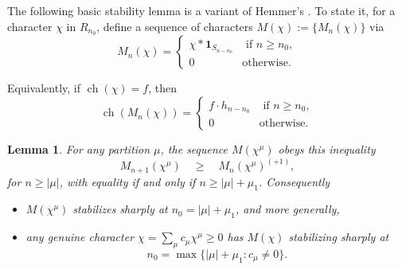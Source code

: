 \documentclass[12pt]{amsart}
\theoremstyle{plain}
\newtheorem{lem}[thm]{Lemma}
\theoremstyle{definition}
\begin{document}
The following basic stability lemma is a variant 
of  Hemmer's \cite[Lem. 2.3, Thm. 2.4]{Hemmer}.
To state it, for a character
$\chi$ in $R_{n_0}$, define a sequence of characters
$M(\chi):=\{M_n(\chi)\}$ via 
\begin{equation}
\label{M-operator-definition}
M_n(\chi) = 
\begin{cases}
\chi * {{\mathbf{1}}}_{S_{n-n_0}} & \text{ if }n \geq n_0,\\
0 & \text{otherwise.}
\end{cases}
\end{equation}

Equivalently, if ${{\operatorname{ch}}}(\chi)=f$, then 
\begin{equation}
\label{M-operator-definition-in-symm-fns}
{{\operatorname{ch}}}\left( M_n(\chi) \right) = 
\begin{cases}
f  \cdot h_{n-n_0} & \text{ if }n \geq n_0,\\
0 & \text{otherwise.}
\end{cases}
\end{equation}

\begin{lem}
\label{Hemmer's-lemma}
For any partition $\mu$,
the sequence $M(\chi^\mu)$ obeys this inequality
\begin{equation}
\label{stability-monotonicity}
M_{n+1}(\chi^\mu) \quad \geq \quad M_n(\chi^\mu)^{(+1)},
\end{equation}
for $n \geq |\mu|$,
with equality if and only if $n \geq |\mu|+\mu_1$.
Consequently 
\begin{itemize}
\item
$M(\chi^\mu)$ stabilizes sharply at $n_0=|\mu|+\mu_1$, and more generally,
\item any genuine character
$\chi=\sum_\mu c_\mu \chi^{\mu} \geq 0$ 
has $M(\chi)$ stabilizing sharply at 
$$
n_0=\max\{|\mu|+\mu_1: c_\mu \neq 0\}.
$$
\end{itemize}
\end{lem}
\end{document}
